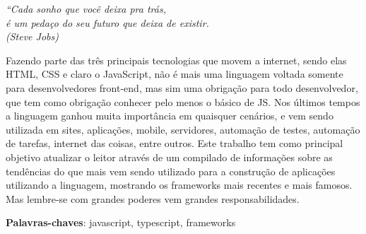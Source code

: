 \documentclass[
	12pt,				%
	openright,			%
	twoside,			%
	a4paper,			%
	english,			%
	brazil				%
	]{abntex2}
\begin{document}


\begin{epigrafe}
    \vspace*{\fill}
	\begin{flushright}
		\textit{``Cada sonho que você deixa pra trás,\\
		é um pedaço do seu futuro que deixa de existir. \\
		(Steve Jobs)}
	\end{flushright}
\end{epigrafe}


\setlength{\absparsep}{18pt} %
\begin{resumo}
Fazendo parte das três principais tecnologias que movem a internet, sendo elas HTML, CSS e claro o JavaScript, não é mais uma linguagem voltada somente para desenvolvedores front-end, mas sim uma obrigação para todo desenvolvedor, que tem como obrigação conhecer pelo menos o básico de JS. Nos últimos tempos a linguagem ganhou muita importância em quaisquer cenários, e vem sendo utilizada em sites, aplicações, mobile, servidores, automação de testes, automação de tarefas, internet das coisas, entre outros. Este trabalho tem como principal objetivo atualizar o leitor através de um compilado de informações sobre as tendências do que mais vem sendo utilizado para a construção de aplicações utilizando a linguagem, mostrando os frameworks mais recentes e mais famosos. Mas lembre-se com grandes poderes vem grandes responsabilidades.

 \vspace{\onelineskip}

 \textbf{Palavras-chaves}: javascript, typescript, frameworks
\end{resumo}
\end{document}
